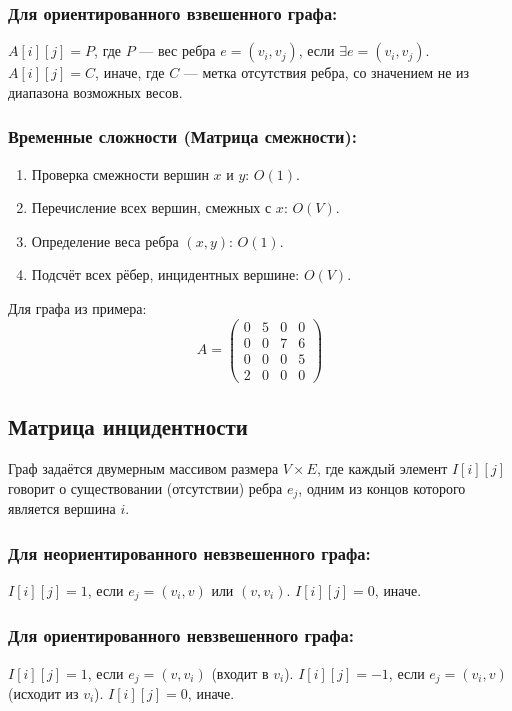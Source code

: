 \subsubsection*{Для ориентированного взвешенного графа:}
$A[i][j]=P$, где $P$ --- вес ребра $e=(v_i, v_j)$, если $\exists e=(v_i, v_j)$.
$A[i][j]=C$, иначе, где $C$ --- метка отсутствия ребра, со значением не из диапазона возможных весов.

\subsubsection*{Временные сложности (Матрица смежности):}
\begin{enumerate}
	\item Проверка смежности вершин $x$ и $y$: $O(1)$.
	\item Перечисление всех вершин, смежных с $x$: $O(V)$.
	\item Определение веса ребра $(x, y)$: $O(1)$.
	\item Подсчёт всех рёбер, инцидентных вершине: $O(V)$.
\end{enumerate}

Для графа из примера:
\begin{equation*}
	A = 
	\begin{pmatrix}
		0 & 5 & 0 & 0\\
		0 & 0 & 7 & 6\\
		0 & 0 & 0 & 5\\
		2 & 0 & 0 & 0
	\end{pmatrix}	
\end{equation*}
\subsection{Матрица инцидентности}
Граф задаётся двумерным массивом размера $V \times E$, где каждый элемент $I[i][j]$ говорит о существовании (отсутствии) ребра $e_j$, одним из концов которого является вершина $i$.

\subsubsection*{Для неориентированного невзвешенного графа:}
$I[i][j]=1$, если $e_j=(v_i, v)$ или $(v, v_i)$.
$I[i][j]=0$, иначе.

\subsubsection*{Для ориентированного невзвешенного графа:}
$I[i][j]=1$, если $e_j=(v, v_i)$ (входит в $v_i$).
$I[i][j]=-1$, если $e_j=(v_i, v)$ (исходит из $v_i$).
$I[i][j]=0$, иначе.

